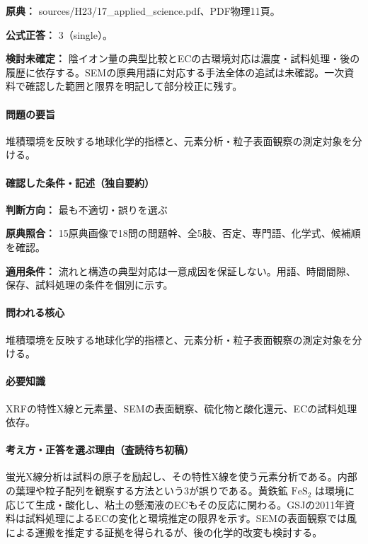 \noindent\textbf{原典：} sources/H23/17\_applied\_science.pdf、PDF物理11頁。

\textbf{公式正答：} 3（single）。

\par\textbf{検討未確定：} 陰イオン量の典型比較とECの古環境対応は濃度・試料処理・後の履歴に依存する。SEMの原典用語に対応する手法全体の追試は未確認。一次資料で確認した範囲と限界を明記して部分校正に残す。

\paragraph{問題の要旨} 堆積環境を反映する地球化学的指標と、元素分析・粒子表面観察の測定対象を分ける。

\paragraph{確認した条件・記述（独自要約）}\mbox{}\par

\noindent\textbf{判断方向：} 最も不適切・誤りを選ぶ\par

\noindent\textbf{原典照合：} 15原典画像で18問の問題幹、全5肢、否定、専門語、化学式、候補順を確認。\par

\noindent\textbf{適用条件：} 流れと構造の典型対応は一意成因を保証しない。用語、時間間隙、保存、試料処理の条件を個別に示す。\par

\paragraph{問われる核心} 堆積環境を反映する地球化学的指標と、元素分析・粒子表面観察の測定対象を分ける。

\paragraph{必要知識} XRFの特性X線と元素量、SEMの表面観察、硫化物と酸化還元、ECの試料処理依存。

\paragraph{考え方・正答を選ぶ理由（査読待ち初稿）} 蛍光X線分析は試料の原子を励起し、その特性X線を使う元素分析である。内部の葉理や粒子配列を観察する方法という3が誤りである。黄鉄鉱 \(\mathrm{FeS_2}\) は環境に応じて生成・酸化し、粘土の懸濁液のECもその反応に関わる。GSJの2011年資料は試料処理によるECの変化と環境推定の限界を示す。SEMの表面観察では風による運搬を推定する証拠を得られるが、後の化学的改変も検討する。

